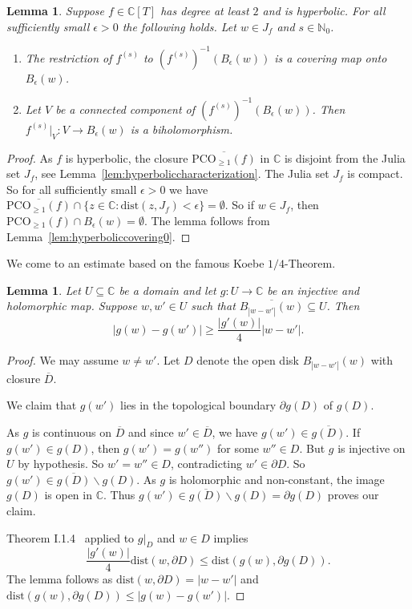 \documentclass[12pt,oneside,a4]{amsart}
\newcommand{\IC}{\mathbb{C}}
\newcommand{\IN}{\mathbb{N}}
\newcounter{maincounter}
\numberwithin{maincounter}{section}
\numberwithin{equation}{section}
\newtheorem{lemma}[maincounter]{Lemma}
\renewcommand{\subset}{\subseteq}
\newcommand{\ssm}{\smallsetminus}
\newcommand{\pco}{\mathrm{PCO}}
\begin{document}
\begin{lemma}
  \label{lem:hyperboliccovering}  
  Suppose $f\in\IC[T]$ has degree at least $2$ and is hyperbolic.
  For all sufficiently small $\epsilon > 0$ the following holds.
  Let $w\in J_f$ and $s\in\IN_0$.
  \begin{enumerate}
  \item [(i)]
    The restriction of $f^{(s)}$ to $(f^{(s)})^{-1}(B_\epsilon(w))$ is a
    covering map onto $B_\epsilon(w)$. 
  \item[(ii)] Let $V$ be a connected component of
    $(f^{(s)})^{-1}(B_\epsilon(w))$. Then $f^{(s)}|_V\colon
    V\rightarrow B_\epsilon(w)$ is a biholomorphism.
  \end{enumerate}
\end{lemma}
\begin{proof}  
  As $f$ is hyperbolic, the closure $\overline{\pco_{\ge 1}(f)}$ in $\IC$ is disjoint from
  the Julia set $J_f$, see Lemma~\ref{lem:hyperboliccharacterization}.  
  The Julia set $J_f$ is compact. So for all sufficiently small  $\epsilon > 0$
  we have
  $\overline{\pco_{\ge 1}(f)} \cap \{z\in \IC :
  \mathrm{dist}(z,J_f)<\epsilon\}=\emptyset$. 
  So if  $w\in J_{f}$, then
   $ \pco_{\ge 1}(f)\cap B_\epsilon(w)=\emptyset$.
  The lemma follows from Lemma~\ref{lem:hyperboliccovering0}.
\end{proof}


We come to an estimate based on the famous Koebe $1/4$-Theorem.
\begin{lemma}
  \label{lem:koebequarterapp}
  Let $U\subset\IC$ be a domain and let $g\colon U\rightarrow\IC$ be
  an injective and holomorphic map. Suppose $w,w'\in U$  such that
  $\overline{B_{|w-w'|}(w)}\subset U$. Then
  \begin{equation*}
    |g(w)-g(w')|\ge \frac{|g'(w)|}{4}|w-w'|.
  \end{equation*}
\end{lemma}
\begin{proof}
  We may assume $w\not=w'$. Let $D$ denote the open disk
  $B_{|w-w'|}(w)$ with closure $\overline D$.

  We claim that $g(w')$ lies in the topological boundary $\partial g(D)$
  of $g(D)$.

  As $g$ is continuous on $\overline D$ and since $w'\in \overline D$,
  we have $g(w') \in
  \overline{g(D)}$. If $g(w')\in g(D)$, then $g(w')=g(w'')$ for some $w''\in
  D$. But $g$ is injective on $U$ by hypothesis. So
  $w'=w''\in D$, contradicting $w'\in \partial D$.
  So $g(w')\in \overline {g(D)}\ssm g(D)$.
  As $g$ is holomorphic and non-constant, the image $g(D)$ is open in $\IC$.
  Thus $g(w')\in \overline {g(D)}\ssm g(D) = \partial g(D)$ proves our
  claim.

  Theorem I.1.4~\cite{CarlesonGamelin} applied to $g|_D$ and $w\in D$ implies
  \begin{equation*}
    \frac{|g'(w)|}{4} \mathrm{dist}(w,\partial D)
    \le \mathrm{dist}(g(w),\partial g(D)).
  \end{equation*}
  The lemma follows as $\mathrm{dist}(w,\partial D)=|w-w'|$ and
  $\mathrm{dist}(g(w),\partial g(D))\le |g(w)-g(w')|$.  
\end{proof}
\end{document}
